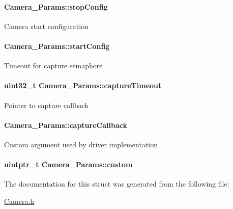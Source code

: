 \paragraph[{stop\+Config}]{ Camera\+\_\+\+Params\+::stop\+Config}\label{struct_camera___params_a89b5c7168ff120da5fc7461fb71499aa}
Camera start configuration 
\paragraph[{start\+Config}]{ Camera\+\_\+\+Params\+::start\+Config}\label{struct_camera___params_aa754cc494ff462b01a7ed647742b15af}
Timeout for capture semaphore 
\paragraph[{capture\+Timeout}]{\setlength{\rightskip}{0pt plus 5cm}uint32\+\_\+t Camera\+\_\+\+Params\+::capture\+Timeout}\label{struct_camera___params_a7a66a4013966579c58e2d02ad788d6ce}
Pointer to capture callback 
\paragraph[{capture\+Callback}]{ Camera\+\_\+\+Params\+::capture\+Callback}\label{struct_camera___params_a2bc1db1262e09919a7711301cd784fda}
Custom argument used by driver implementation 
\paragraph[{custom}]{\setlength{\rightskip}{0pt plus 5cm}uintptr\+\_\+t Camera\+\_\+\+Params\+::custom}\label{struct_camera___params_ab2f522ea8c1e8b656d01ebd110847b70}


The documentation for this struct was generated from the following file\+:\begin{DoxyCompactItemize}
\item 
\hyperlink{_camera_8h}{Camera.\+h}\end{DoxyCompactItemize}
